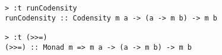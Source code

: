 \begin{repl}\begin{lstlisting}
> :t runCodensity
runCodensity :: Codensity m a -> (a -> m b) -> m b

> :t (>>=)
(>>=) :: Monad m => m a -> (a -> m b) -> m b\end{lstlisting}\end{repl}
